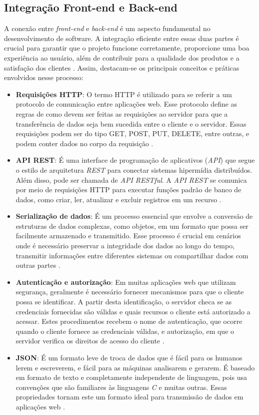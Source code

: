 \subsection{Integração Front-end e Back-end}

A conexão entre \textit{front-end} e \textit{back-end} é um aspecto fundamental no desenvolvimento de software. A integração eficiente entre essas duas partes é crucial para garantir que o projeto funcione corretamente, proporcione uma boa experiência ao usuário, além de contribuir para a qualidade dos produtos e a satisfação dos clientes \cite{da2024guia}. Assim, destacam-se os principais conceitos e práticas envolvidos nesse processo:

\begin{itemize}
    \item \textbf{Requisições HTTP}: O termo HTTP é utilizado para se referir a um protocolo de comunicação entre aplicações web. Esse protocolo define as regras de como devem ser feitas as requisições ao servidor para que a transferência de dados seja bem sucedida entre o cliente e o servidor. Essas requisições podem ser do tipo GET, POST, PUT, DELETE, entre outras, e podem conter dados no corpo da requisição \cite{portilho2021desenvolvimento}.
    \item \textbf{API REST}: É uma interface de programação de aplicativos (\textit{API}) que segue o estilo de arquitetura \textit{REST} para conectar sistemas hipermídia distribuídos. Além disso, pode ser chamada de \textit{API RESTful}. A \textit{API REST} se comunica por meio de requisições HTTP para executar funções padrão de banco de dados, como criar, ler, atualizar e excluir registros em um recurso \cite{ibm2025}.
    \item \textbf{Serialização de dados}: É um processo essencial que envolve a conversão de estruturas de dados complexas, como objetos, em um formato que possa ser facilmente armazenado e transmitido. Esse processo é crucial em cenários onde é necessário preservar a integridade dos dados ao longo do tempo, transmitir informações entre diferentes sistemas ou compartilhar dados com outras partes \cite{castilhos2024analise}.
    \item \textbf{Autenticação e autorização}: Em muitas aplicações web que utilizam segurança, geralmente é necessário fornecer mecanismos para que o cliente possa se identificar. A partir desta identificação, o servidor checa se as credenciais fornecidas são válidas e quais recursos o cliente está autorizado a acessar. Estes procedimentos recebem o nome de autenticação, que ocorre quando o cliente fornece as credenciais válidas, e autorização, em que o servidor verifica os direitos de acesso do cliente \cite{oliveira2014desenvolvimento}.
    \item \textbf{JSON}: É um formato leve de troca de dados que é fácil para os humanos lerem e escreverem, e fácil para as máquinas analisarem e gerarem. É baseado em formato de texto e completamente independente de linguagem, pois usa convenções que são familiares às linguagens \textit{C} e muitas outras. Essas propriedades tornam este um formato ideal para transmissão de dados em aplicações web \cite{json2025}.
\end{itemize}

